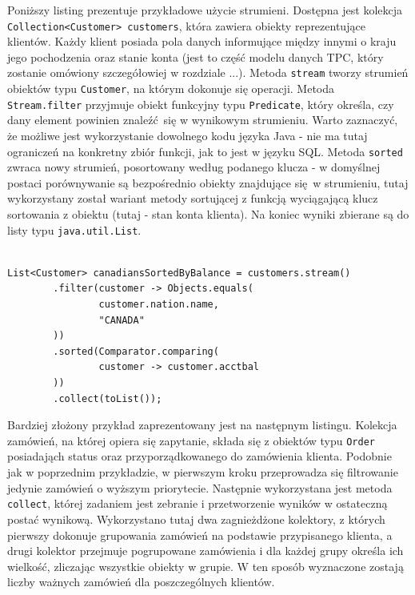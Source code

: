 \documentclass[12pt]{extarticle}
\begin{document}
    Poniższy listing prezentuje przykładowe użycie strumieni. Dostępna jest kolekcja \texttt{Collection<Customer> customers}, która zawiera obiekty reprezentujące klientów. Każdy klient posiada pola danych informujące między innymi o kraju jego pochodzenia oraz stanie konta (jest to część modelu danych TPC, który zostanie omówiony szczegółowiej w rozdziale ...). Metoda \texttt{stream} tworzy strumień obiektów typu \texttt{Customer}, na którym dokonuje się operacji. Metoda \texttt{Stream.filter} przyjmuje obiekt funkcyjny typu \texttt{Predicate}, który określa, czy dany element powinien znaleźć się w wynikowym strumieniu. Warto zaznaczyć, że możliwe jest wykorzystanie dowolnego kodu języka Java - nie ma tutaj ograniczeń na konkretny zbiór funkcji, jak to jest w języku SQL. Metoda \texttt{sorted} zwraca nowy strumień, posortowany według podanego klucza - w domyślnej postaci porównywanie są bezpośrednio obiekty znajdujące się w strumieniu, tutaj wykorzystany został wariant metody sortującej z funkcją wyciągającą klucz sortowania z obiektu (tutaj - stan konta klienta). Na koniec wyniki zbierane są do listy typu \texttt{java.util.List}. 

\begin{lstlisting}[label=testclass, caption=Przykładowe wykorzystanie Stream API]

List<Customer> canadiansSortedByBalance = customers.stream()
        .filter(customer -> Objects.equals(
                customer.nation.name,
                "CANADA"
        ))
        .sorted(Comparator.comparing(
                customer -> customer.acctbal
        ))
        .collect(toList());

\end{lstlisting}

    Bardziej złożony przykład zaprezentowany jest na następnym listingu. Kolekcja zamówień, na której opiera się zapytanie, składa się z obiektów typu \texttt{Order} posiadająch status oraz przyporządkowanego do zamówienia klienta. Podobnie jak w poprzednim przykładzie, w pierwszym kroku przeprowadza się filtrowanie jedynie zamówień o wyższym priorytecie. Następnie wykorzystana jest metoda \texttt{collect}, której zadaniem jest zebranie i przetworzenie wyników w ostateczną postać wynikową. Wykorzystano tutaj dwa zagnieżdżone kolektory, z których pierwszy dokonuje grupowania zamówień na podstawie przypisanego klienta, a drugi kolektor przejmuje pogrupowane zamówienia i dla każdej grupy określa ich wielkość, zliczając wszystkie obiekty w grupie. W ten sposób wyznaczone zostają liczby ważnych zamówień dla poszczególnych klientów.
\end{document}
